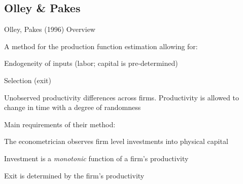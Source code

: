 \subsection{Olley \& Pakes}


\begin{frame}{Olley, Pakes (1996)}
	Overview
	\bi
		\item{A method for the production function estimation allowing for:}
		\bi
			\item{Endogeneity of inputs (labor; capital is pre-determined)}
			\item{Selection (exit)}
			\item{Unobserved productivity differences across firms. Productivity is allowed to change in time with a degree of randomness}
		\ei
		\item{Main requirements of their method:}
		\bi
			\item{The econometrician observes firm level investments into physical capital}
			\item{Investment is a \emph{monotonic} function of a firm's productivity}
			\item{Exit is determined by the firm's productivity}
		\ei
	\ei
\end{frame}



